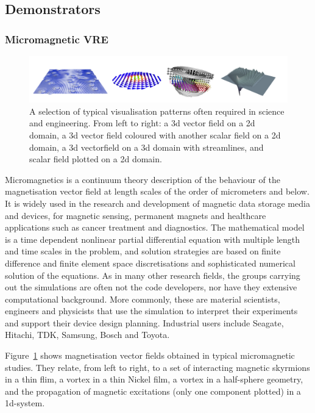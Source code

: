 \subsection{Demonstrators}
\subsubsection{Micromagnetic VRE}
\label{sec:introduction-micromagnetic-vre-demonstrator}

\begin{figure}
\includegraphics[width=1.0\textwidth]{Pictures/micromagnetic-and-3d-vis-4x1.pdf}
\caption{\label{fig:3d-plots} A selection of typical visualisation patterns often required in science and engineering. From left to right: a 3d vector field on a 2d domain, a 3d vector field coloured with another scalar field on a 2d domain, a 3d vectorfield on a 3d domain with streamlines, and scalar field plotted on a 2d domain.}
\end{figure}

Micromagnetics is a continuum theory description of the behaviour of
the magnetisation vector field at length scales of the order of
micrometers and below. It is widely used in the research and
development of magnetic data storage media and devices, for magnetic
sensing, permanent magnets and healthcare applications such as cancer
treatment and diagnostics. The mathematical model is a time dependent
nonlinear partial differential equation with multiple length and time
scales in the problem, and solution strategies are based on finite
difference and finite element space discretisations and sophisticated
numerical solution of the equations. As in many other research fields,
the groups carrying out the simulations are often not the code
developers, nor have they extensive computational background. More
commonly, these are material scientists, engineers and physicists that
use the simulation to interpret their experiments and support their
device design planning. Industrial users include Seagate, Hitachi,
TDK, Samsung, Bosch and Toyota.

Figure~\ref{fig:3d-plots} shows magnetisation vector fields obtained
in typical micromagnetic studies. They relate, from left to
right, to a set of interacting magnetic skyrmions in a thin flim, a
vortex in a thin Nickel film, a vortex in a half-sphere geometry, and
the propagation of magnetic excitations (only one component plotted)
in a 1d-system.

